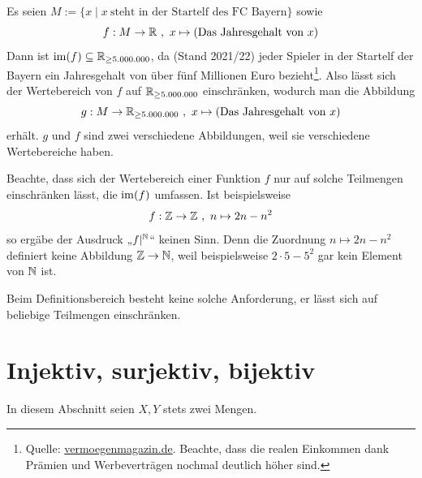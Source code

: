 \begin{bsp}[*]
    Es seien $M := \{ x\mid x\ \text{steht in der Startelf des FC Bayern} \}$ sowie
        \[ f : M \to \mathbb R \ ,\ x \mapsto (\text{Das Jahresgehalt von $x$}) \]
    Dann ist $\operatorname{im}(f)\subseteq \mathbb R_{\ge 5.000.000}$, da (Stand 2021/22) jeder Spieler in der Startelf der Bayern ein Jahresgehalt von über fünf Millionen Euro bezieht\footnote{Quelle: \href{https://www.vermoegenmagazin.de/bayern-muenchen-gehaelter/}{vermoegenmagazin.de}. Beachte, dass die realen Einkommen dank Prämien und Werbeverträgen nochmal deutlich höher sind.}. Also lässt sich der Wertebereich von $f$ auf $\mathbb R_{\ge 5.000.000}$ einschränken, wodurch man die Abbildung
        \[ g: M \to \mathbb R_{\ge 5.000.000} \ ,\ x \mapsto (\text{Das Jahresgehalt von $x$}) \]
    erhält. $g$ und $f$ sind zwei verschiedene Abbildungen, weil sie verschiedene Wertebereiche haben.
\end{bsp}


\begin{bem}[*] \label{einschraenkbarkeit}
    Beachte, dass sich der Wertebereich einer Funktion $f$ nur auf solche Teilmengen einschränken lässt, die $\operatorname{im}(f)$ umfassen. Ist beispielsweise
        \[ f : \mathbb Z \to \mathbb Z \ ,\ n \mapsto 2n-n^2 \]
    so ergäbe der Ausdruck „$f\vert^{\mathbb N}$“ keinen Sinn. Denn die Zuordnung $n\mapsto 2n-n^2$ definiert keine Abbildung $\mathbb Z\to \mathbb N$, weil beispielsweise $2\cdot 5 - 5^2$ gar kein Element von $\mathbb N$ ist.

    Beim Definitionsbereich besteht keine solche Anforderung, er lässt sich auf beliebige Teilmengen einschränken.
\end{bem}





\section{Injektiv, surjektiv, bijektiv}


In diesem Abschnitt seien $X,Y$ stets zwei Mengen.


